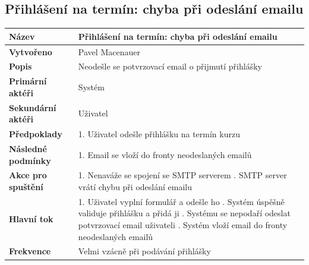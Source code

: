 \documentclass[12pt,a4paper,titlepage,final]{report}
\begin{document}
\subsection{Přihlášení na termín: chyba při odeslání emailu}
\begin{center}
    \begin{tabular}{ | p{4.5cm} | p{13cm} | }
    \hline
    \textbf{Název} & Přihlášení na termín: chyba při odeslání emailu
    \\ \hline
    
	\textbf{Vytvořeno} & Pavel Macenauer 
	\\ \hline
	
	\textbf{Popis} & Neodešle se potvrzovací email o přijmutí přihlášky
	\\ \hline
	    
	\textbf{Primární aktéři} & Systém
	\\ \hline
	
	\textbf{Sekundární aktéři} & Uživatel
	\\ \hline
	
	\textbf{Předpoklady} & 1. Uživatel odešle přihlášku na termín kurzu
    \\ \hline
    
    \textbf{Následné podmínky} & 1. Email se vloží do fronty neodeslaných emailů
    \\ \hline 
        
    \textbf{Akce pro spuštění} & 1. Nenaváže se spojení se SMTP serverem
    	\newline 2. SMTP server vrátí chybu při odeslání emailu
    \\ \hline
    
    \textbf{Hlavní tok} & 1. Uživatel vyplní formulář a odešle ho
    	\newline 2. Systém úspěšně validuje přihlášku a přidá ji
    	\newline 3. Systému se nepodaří odeslat potvrzovací email uživateli
    	\newline 4. Systém vloží email do fronty neodeslaných emailů
    \\ \hline    
    
	\textbf{Frekvence} & Velmi vzácně při podávání přihlášky
	\\ \hline
	\end{tabular}
\end{center}
\end{document}
